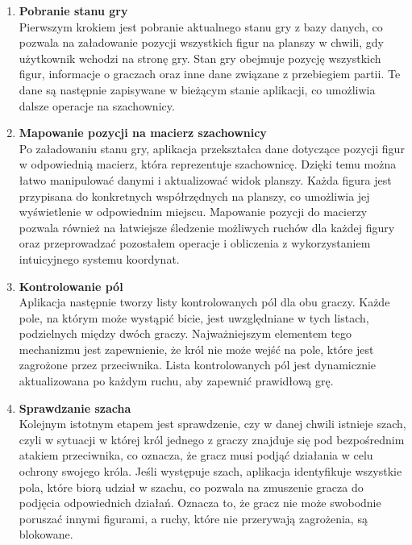 \documentclass[12pt,a4paper]{article}
\begin{document}
\begin{enumerate}
    \item \textbf{Pobranie stanu gry}\\
    Pierwszym krokiem jest pobranie aktualnego stanu gry z bazy danych, co pozwala na załadowanie pozycji wszystkich figur na planszy w chwili, gdy użytkownik wchodzi na stronę gry. Stan gry obejmuje pozycję wszystkich figur, informacje o graczach oraz inne dane związane z przebiegiem partii. Te dane są następnie zapisywane w bieżącym stanie aplikacji, co umożliwia dalsze operacje na szachownicy.

    \item \textbf{Mapowanie pozycji na macierz szachownicy}\\
    Po załadowaniu stanu gry, aplikacja przekształca dane dotyczące pozycji figur w odpowiednią macierz, która reprezentuje szachownicę. Dzięki temu można łatwo manipulować danymi i aktualizować widok planszy. Każda figura jest przypisana do konkretnych współrzędnych na planszy, co umożliwia jej wyświetlenie w odpowiednim miejscu. Mapowanie pozycji do macierzy pozwala również na łatwiejsze śledzenie możliwych ruchów dla każdej figury oraz przeprowadzać pozostałem operacje i obliczenia z wykorzystaniem intuicyjnego systemu koordynat.

    \item \textbf{Kontrolowanie pól}\\
    Aplikacja następnie tworzy listy kontrolowanych pól dla obu graczy. Każde pole, na którym może wystąpić bicie, jest uwzględniane w tych listach, podzielnych między dwóch graczy. Najważniejszym elementem tego mechanizmu jest zapewnienie, że król nie może wejść na pole, które jest zagrożone przez przeciwnika. Lista kontrolowanych pól jest dynamicznie aktualizowana po każdym ruchu, aby zapewnić prawidłową grę.

    \item \textbf{Sprawdzanie szacha}\\
    Kolejnym istotnym etapem jest sprawdzenie, czy w danej chwili istnieje szach, czyli w sytuacji w której król jednego z graczy znajduje się pod bezpośrednim atakiem przeciwnika, co oznacza, że gracz musi podjąć działania w celu ochrony swojego króla. Jeśli występuje szach, aplikacja identyfikuje wszystkie pola, które biorą udział w szachu, co pozwala na zmuszenie gracza do podjęcia odpowiednich działań. Oznacza to, że gracz nie może swobodnie poruszać innymi figurami, a ruchy, które nie przerywają zagrożenia, są blokowane.


\end{enumerate}
\end{document}
